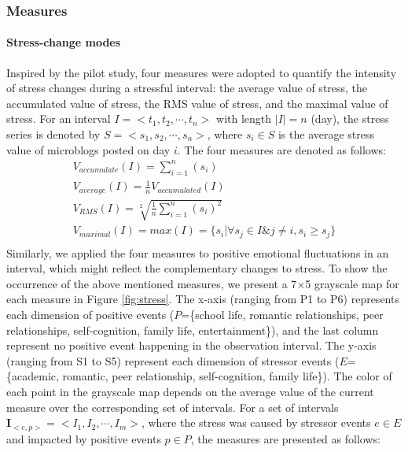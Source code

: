 \subsubsection{Measures}
\label{subsubM}
\paragraph{\textbf{Stress-change modes}} 
Inspired by the pilot study,
four measures were adopted to quantify the intensity of stress changes during a stressful interval:
the average value of stress, 
the accumulated value of stress, 
the RMS value of stress, and the maximal value of stress.
For an interval $I=<t_1,t_2,\cdots,t_n>$ with length $|I|=n$ (day),
the stress series is denoted by $S=<s_1,s_2,\cdots,s_n>$, 
where $s_i \in S$ is the average stress value of microblogs posted on day $i$. 
The four measures are denoted as follows: 
\begin{equation}
\begin{aligned}
&V_{accumulate}(I)= \sum_{i=1}^{n}(s_i)&\\
&V_{average}(I)= \frac{1}{n}V_{accumulated}(I)&\\
&V_{RMS}(I) = \sqrt[2]{ \frac{1}{n}\sum_{i=1}^{n}{(s_i)^2}}&\\
&V_{maximal}(I) = max(I) = \{s_i |\forall s_j \in I \& j \neq i, s_i \geq s_j\}&\\
 \end{aligned}
 \end{equation}
Similarly,
we applied the four measures to positive emotional fluctuations in an interval,
which might reflect the complementary changes to stress.
To show the occurrence of the above mentioned measures, 
we present a 7$\times$5 grayscale map for each measure in Figure \ref{fig:stress}. 
The x-axis (ranging from P1 to P6) represents each dimension of positive events 
($P$=\{school life, romantic relationships, peer relationships, self-cognition, family life, entertainment\}),
and the last column represent no positive event happening in the observation interval.
The y-axis (ranging from S1 to S5) represent each dimension of stressor events
($E$=\{academic, romantic, peer relationship, self-cognition, family life\}). 
The color of each point in the grayscale map depends on the average value of the current measure over the corresponding set of intervals.
For a set of intervals $\textbf{I}_{<e,p>} = <I_1,I_2,\cdots,I_m>$, 
where the stress was caused by stressor events $e \in E$
and impacted by positive events $p \in P$,
the measures are presented as follows: 
